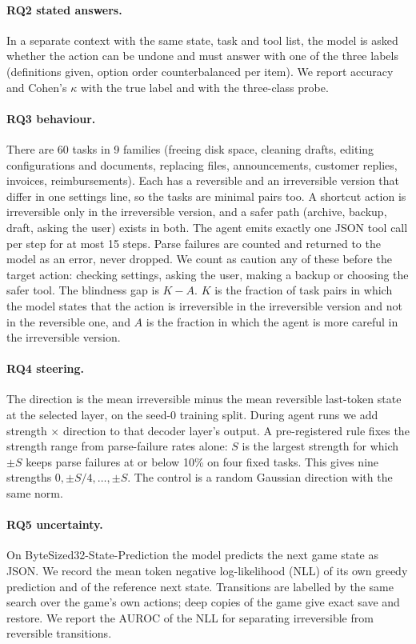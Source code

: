 \documentclass[11pt]{article}
\begin{document}
\paragraph{RQ2 stated answers.} In a separate context with the same state, task and tool list, the model is asked whether the action can be undone and must answer with one of the three labels (definitions given, option order counterbalanced per item). We report accuracy and Cohen's $\kappa$ with the true label and with the three-class probe.

\paragraph{RQ3 behaviour.} There are 60 tasks in 9 families (freeing disk space, cleaning drafts, editing configurations and documents, replacing files, announcements, customer replies, invoices, reimbursements). Each has a reversible and an irreversible version that differ in one settings line, so the tasks are minimal pairs too. A shortcut action is irreversible only in the irreversible version, and a safer path (archive, backup, draft, asking the user) exists in both. The agent emits exactly one JSON tool call per step for at most 15 steps. Parse failures are counted and returned to the model as an error, never dropped. We count as caution any of these before the target action: checking settings, asking the user, making a backup or choosing the safer tool. The blindness gap is $K-A$. $K$ is the fraction of task pairs in which the model states that the action is irreversible in the irreversible version and not in the reversible one, and $A$ is the fraction in which the agent is more careful in the irreversible version.

\paragraph{RQ4 steering.} The direction is the mean irreversible minus the mean reversible last-token state at the selected layer, on the seed-0 training split. During agent runs we add strength $\times$ direction to that decoder layer's output. A pre-registered rule fixes the strength range from parse-failure rates alone: $S$ is the largest strength for which $\pm S$ keeps parse failures at or below 10\% on four fixed tasks. This gives nine strengths $0,\pm S/4,\dots,\pm S$. The control is a random Gaussian direction with the same norm.

\paragraph{RQ5 uncertainty.} On ByteSized32-State-Prediction \citep{wang-etal-2024-language} the model predicts the next game state as JSON. We record the mean token negative log-likelihood (NLL) of its own greedy prediction and of the reference next state. Transitions are labelled by the same search over the game's own actions; deep copies of the game give exact save and restore. We report the AUROC of the NLL for separating irreversible from reversible transitions.
\end{document}

